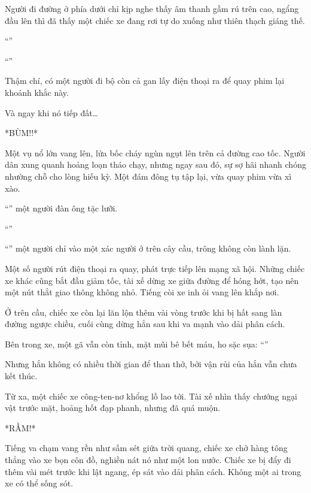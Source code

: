 \documentclass[../main.tex]{subfiles}
\begin{document}
Người đi đường ở phía dưới chỉ kịp nghe thấy âm thanh gầm rú trên cao, ngẩng đầu lên thì đã thấy một chiếc xe đang rơi tự do xuống như thiên thạch giáng thế.

``''

``''

Thậm chí, có một người đi bộ còn cả gan lấy điện thoại ra để quay phim lại khoảnh khắc này.

Và ngay khi nó tiếp đất\dots

*BÙM!!*

Một vụ nổ lớn vang lên, lửa bốc cháy ngùn ngụt lên trên cả đường cao tốc. Người dân xung quanh hoảng loạn tháo chạy, nhưng ngay sau đó, sự sợ hãi nhanh chóng nhường chỗ cho lòng hiếu kỳ. Một đám đông tụ tập lại, vừa quay phim vừa xì xào.

``'' một người đàn ông tặc lưỡi.

``''

``'' một người chỉ vào một xác người ở trên cây cầu, trông không còn lành lặn.

Một số người rút điện thoại ra quay, phát trực tiếp lên mạng xã hội. Những chiếc xe khác cũng bắt đầu giảm tốc, tài xế dừng xe giữa đường để hóng hớt, tạo nên một nút thắt giao thông không nhỏ. Tiếng còi xe inh ỏi vang lên khắp nơi.

Ở trên cầu, chiếc xe còn lại lăn lộn thêm vài vòng trước khi bị hất sang làn đường ngược chiều, cuối cùng dừng hẳn sau khi va mạnh vào dải phân cách.

Bên trong xe, một gã vẫn còn tỉnh, mặt mũi bê bết máu, ho sặc sụa: ``''

Nhưng hắn không có nhiều thời gian để than thở, bởi vận rủi của hắn vẫn chưa kết thúc.

Từ xa, một chiếc xe công-ten-nơ khổng lồ lao tới. Tài xế nhìn thấy chướng ngại vật trước mặt, hoảng hốt đạp phanh, nhưng đã quá muộn.

*RẦM!*

Tiếng va chạm vang rền như sấm sét giữa trời quang, chiếc xe chở hàng tông thẳng vào xe bọn côn đồ, nghiền nát nó như một lon nước. Chiếc xe bị đẩy đi thêm vài mét trước khi lật ngang, ép sát vào dải phân cách. Không một ai trong xe có thể sống sót.
\end{document}
